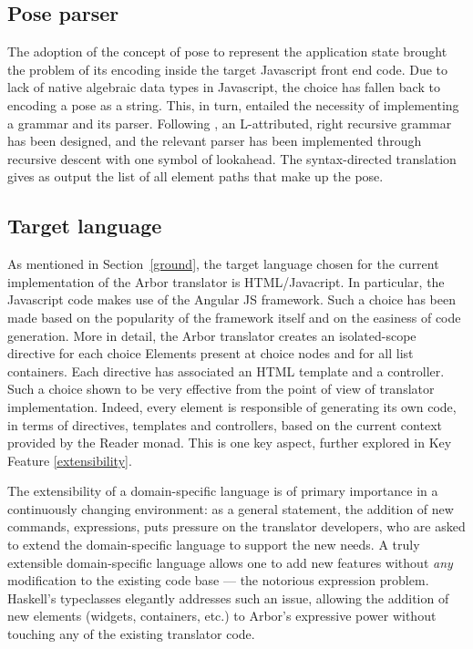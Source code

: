 \documentclass[12pt]{article} %
\newcommand{\fe}{front end}
\newcommand{\dsl}{domain-specific language}
\newcommand{\adt}{algebraic data type}
\newcommand{\A}{Arbor}
\newcommand{\Hs}{Haskell}
\newcounter{kfcounter}
\newenvironment{kfe}[2]
	{\refstepcounter{kfcounter}\begin{tcolorbox}[colback=green!35!white,colframe=brown!75!red,title=Key Feature \thekfcounter: \emph{#1}\label{#2}]}
	{\end{tcolorbox}}
\begin{document}
\subsection{Pose parser}
The adoption of the concept of pose to represent the application state brought the problem of its encoding inside the target Javascript \fe{} code. Due to lack of native \adt{}s in Javascript, the choice has fallen back to encoding a pose as a string. This, in turn, entailed the necessity of implementing a grammar and its parser.
Following \cite{aho}, an L-attributed, right recursive grammar has been designed, and the relevant parser has been implemented through recursive descent with one symbol of lookahead. The syntax-directed translation gives as output the list of all element paths that make up the pose.
\subsection{Target language}
As mentioned in Section~\ref{ground}, the target language chosen for the current implementation of the \A{} translator is HTML/Javacript. In particular, the Javascript code makes use of the Angular JS framework. Such a choice has been made based on the popularity of the framework itself and on the easiness of code generation. More in detail, the \A{} translator creates an isolated-scope directive for each choice Elements present at choice nodes and for all list containers. Each directive has associated an HTML template and a controller. Such a choice shown to be very effective from the point of view of translator implementation. Indeed, every element is responsible of generating its own code, in terms of directives, templates and controllers, based on the current context provided by the Reader monad. This is one key aspect, further explored in Key Feature \ref{extensibility}.

\begin{kfe}{Extensibility}{extensibility}
The extensibility of a \dsl{} is of primary importance in a continuously changing environment: as a general statement, the addition of new commands, expressions, puts pressure on the translator developers, who are asked to extend the \dsl{} to support the new needs. A truly extensible \dsl{} allows one to add new features without \emph{any} modification to the existing code base --- the notorious expression problem\cite{reyn}. \Hs{}'s typeclasses elegantly addresses such an issue, allowing the addition of new elements (widgets, containers, etc.) to \A{}'s expressive power without touching any of the existing translator code.
\end{kfe}
\end{document}

